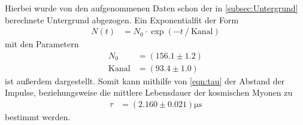 Hierbei wurde von den aufgenommenen Daten schon der in \autoref{subsec:Untergrund} berechnete Untergrund abgezogen.
Ein Exponentialfit der Form
\begin{align*}
  N(t) &= N_0 \cdot \exp(-t \mathbin{/} \text{Kanal})
\end{align*}
mit den Parametern 
\begin{align*}
  N_0 &= (156.1 \pm 1.2)\\
  \text{Kanal} &= (93.4 \pm 1.0)
\end{align*}
ist außerdem dargestellt.
Somit kann mithilfe von \autoref{eqn:tau} der Abstand der Impulse, beziehungsweise die mittlere Lebensdauer der kosmischen Myonen
zu 
\begin{align*}
  \tau &= (2.160 \pm 0.021)\si{\micro\second}
\end{align*}
bestimmt werden.

